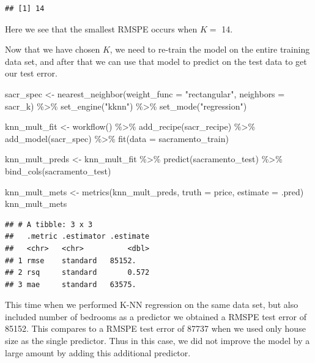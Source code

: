 \documentclass[
]{krantz}
\makeatletter
\newenvironment{Shaded}{\begin{snugshade}}{\end{snugshade}}
\newcommand{\AttributeTok}[1]{\textcolor[rgb]{0.61,0.61,0.61}{#1}}
\newcommand{\FunctionTok}[1]{\textcolor[rgb]{0,0,0}{#1}}
\newcommand{\NormalTok}[1]{#1}
\newcommand{\OtherTok}[1]{\textcolor[rgb]{0.37,0.37,0.37}{#1}}
\newcommand{\SpecialCharTok}[1]{\textcolor[rgb]{0,0,0}{#1}}
\newcommand{\StringTok}[1]{\textcolor[rgb]{0.5,0.5,0.5}{#1}}
\newenvironment{kframe}{%
\medskip{}
\setlength{\fboxsep}{.8em}
 \def\at@end@of@kframe{}%
 \ifinner\ifhmode%
  \def\at@end@of@kframe{\end{minipage}}%
  \begin{minipage}{\columnwidth}%
 \fi\fi%
 \def\FrameCommand##1{\hskip\@totalleftmargin \hskip-\fboxsep
 \colorbox{shadecolor}{##1}\hskip-\fboxsep
     \hskip-\linewidth \hskip-\@totalleftmargin \hskip\columnwidth}%
 \MakeFramed {\advance\hsize-\width
   \@totalleftmargin\z@ \linewidth\hsize
   \@setminipage}}%
 {\par\unskip\endMakeFramed%
 \at@end@of@kframe}
\renewenvironment{Shaded}{\begin{kframe}}{\end{kframe}}
\makeatother
\begin{document}
\begin{verbatim}
## [1] 14
\end{verbatim}

Here we see that the smallest RMSPE occurs when \(K =\) 14.

Now that we have chosen \(K\), we need to re-train the model on the entire
training data set, and after that we can use that model to predict
on the test data to get our test error.

\begin{Shaded}
\begin{Highlighting}[]
\NormalTok{sacr\_spec }\OtherTok{\textless{}{-}} \FunctionTok{nearest\_neighbor}\NormalTok{(}\AttributeTok{weight\_func =} \StringTok{"rectangular"}\NormalTok{, }\AttributeTok{neighbors =}\NormalTok{ sacr\_k) }\SpecialCharTok{\%\textgreater{}\%}
  \FunctionTok{set\_engine}\NormalTok{(}\StringTok{"kknn"}\NormalTok{) }\SpecialCharTok{\%\textgreater{}\%}
  \FunctionTok{set\_mode}\NormalTok{(}\StringTok{"regression"}\NormalTok{)}

\NormalTok{knn\_mult\_fit }\OtherTok{\textless{}{-}} \FunctionTok{workflow}\NormalTok{() }\SpecialCharTok{\%\textgreater{}\%}
  \FunctionTok{add\_recipe}\NormalTok{(sacr\_recipe) }\SpecialCharTok{\%\textgreater{}\%}
  \FunctionTok{add\_model}\NormalTok{(sacr\_spec) }\SpecialCharTok{\%\textgreater{}\%}
  \FunctionTok{fit}\NormalTok{(}\AttributeTok{data =}\NormalTok{ sacramento\_train)}

\NormalTok{knn\_mult\_preds }\OtherTok{\textless{}{-}}\NormalTok{ knn\_mult\_fit }\SpecialCharTok{\%\textgreater{}\%}
  \FunctionTok{predict}\NormalTok{(sacramento\_test) }\SpecialCharTok{\%\textgreater{}\%}
  \FunctionTok{bind\_cols}\NormalTok{(sacramento\_test)}

\NormalTok{knn\_mult\_mets }\OtherTok{\textless{}{-}} \FunctionTok{metrics}\NormalTok{(knn\_mult\_preds, }\AttributeTok{truth =}\NormalTok{ price, }\AttributeTok{estimate =}\NormalTok{ .pred)}
\NormalTok{knn\_mult\_mets}
\end{Highlighting}
\end{Shaded}

\begin{verbatim}
## # A tibble: 3 x 3
##   .metric .estimator .estimate
##   <chr>   <chr>          <dbl>
## 1 rmse    standard   85152.   
## 2 rsq     standard       0.572
## 3 mae     standard   63575.
\end{verbatim}

This time when we performed K-NN regression on the same data set, but also
included number of bedrooms as a predictor we obtained a RMSPE test error
of 85152.
This compares to a RMSPE test error
of 87737
when we used only house size as the
single predictor. Thus in this case, we did not improve the model
by a large amount by adding this additional predictor.
\end{document}
